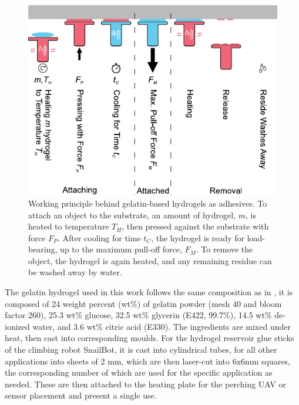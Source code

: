 \begin{figure}
  \includegraphics[width=\linewidth]{chapters/papers/SB/figures/fig-schematic/fig-schematic.pdf}
  \caption{Working principle behind gelatin-based hydrogels as adhesives. To attach an object to the substrate, an amount of  hydrogel, $m$, is heated to temperature $T_H$, then pressed against the substrate with force $F_P$. After cooling for time $t_C$, the hydrogel is ready for load-bearing, up to the maximum pull-off force, $F_M$. To remove the object, the hydrogel is again heated, and any remaining residue can be washed away by water.}
  \label{fig:fig-schematic}
\end{figure}

The gelatin hydrogel used in this work follows the same composition as in \cite{Geckeler2023b}, it is composed of 24 weight percent (wt\%) of gelatin powder (mesh 40 and bloom factor 260), 25.3 wt\% glucose, 32.5 wt\% glycerin (E422, 99.7\%), 14.5 wt\% de-ionized water, and 3.6 wt\% citric acid (E330). The ingredients are mixed under heat, then cast into corresponding moulds. For the hydrogel reservoir glue sticks of the climbing robot SnailBot, it is cast into cylindrical tubes, for all other applications into sheets of 2 mm, which are then laser-cut into 6x6mm squares, the corresponding number of which are used for the specific application as needed. These are then attached to the heating plate for the perching UAV or sensor placement and present a single use.



